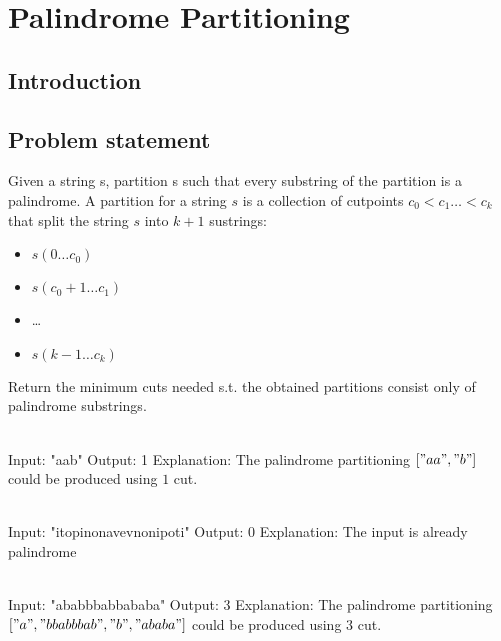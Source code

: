 %

\chapter{Palindrome Partitioning }
\label{ch:palindrome_partitioning2}
\section*{Introduction}

\section{Problem statement}
\begin{exercise}
Given a string s, partition s such that every substring of the partition is a palindrome. A partition for a string $s$ is a collection of cutpoints $c_0 < c_1 \ldots < c_k$ that split the string $s$ into $k+1$ sustrings:
\begin{itemize}
	\item $s(0 \ldots c_0)$
	\item $s(c_0+1 \ldots c_1)$
	\item \ldots
	\item $s(k-1 \ldots c_k)$
\end{itemize}

Return the minimum cuts needed s.t. the obtained partitions consist only of palindrome substrings.

	\begin{example}
		\hfill \\
		Input: "aab"
		Output: 1
		Explanation: The palindrome partitioning $["aa","b"]$ could be produced using $1$ cut.
	\end{example}

	\begin{example}
		\hfill \\
		Input: "itopinonavevnonipoti"
		Output: 0
		Explanation: The input is already palindrome
	\end{example}

	\begin{example}
		\hfill \\
		Input: "ababbbabbababa"
		Output: 3
		Explanation: The palindrome partitioning $["a","bbabbbab","b","ababa"]$ could be produced using $3$ cut.

	\end{example}
\end{exercise}
